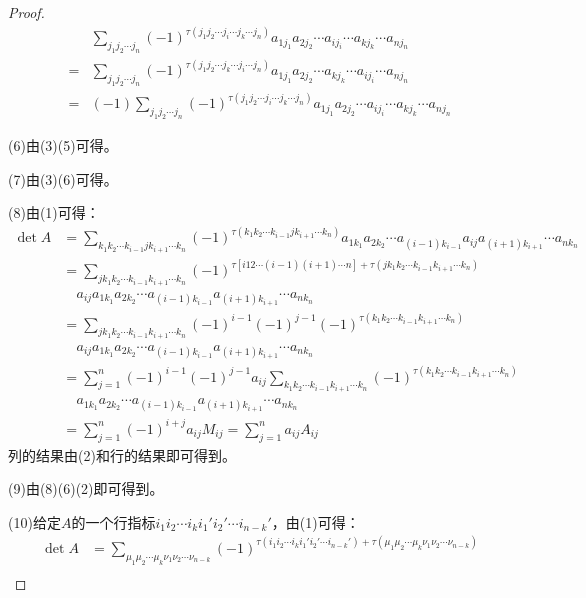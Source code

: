 \begin{proof}
	\begin{align*}
		&\sum_{j_1j_2\cdots j_n}^{}(-1)^{\tau(j_1j_2\cdots j_i\cdots j_k\cdots j_n)}a_{1j_1}a_{2j_2}\cdots a_{ij_i}\cdots a_{kj_k}\cdots a_{nj_n} \\
		=&\sum_{j_1j_2\cdots j_n}^{}(-1)^{\tau(j_1j_2\cdots j_k\cdots j_i\cdots j_n)}a_{1j_1}a_{2j_2}\cdots a_{kj_k}\cdots a_{ij_i}\cdots a_{nj_n} \\
		=&(-1)\sum_{j_1j_2\cdots j_n}^{}(-1)^{\tau(j_1j_2\cdots j_i\cdots j_k\cdots j_n)}a_{1j_1}a_{2j_2}\cdots a_{ij_i}\cdots a_{kj_k}\cdots a_{nj_n}
	\end{align*}\par
	(6)由(3)(5)可得。\par
	(7)由(3)(6)可得。\par
	(8)由(1)可得：
	\begin{align*}
		\det A&=\sum_{k_1k_2\cdots k_{i-1}jk_{i+1}\cdots k_n}^{}(-1)^{\tau(k_1k_2\cdots k_{i-1}jk_{i+1}\cdots k_n)}a_{1k_1}a_{2k_2}\cdots a_{(i-1)k_{i-1}}a_{ij}a_{(i+1)k_{i+1}}\cdots a_{nk_n} \\
		&=\sum_{jk_1k_2\cdots k_{i-1}k_{i+1}\cdots k_n}^{}(-1)^{\tau[i12\cdots(i-1)(i+1)\cdots n]+\tau(jk_1k_2\cdots k_{i-1}k_{i+1}\cdots k_n)} \\
		&\quad a_{ij}a_{1k_1}a_{2k_2}\cdots a_{(i-1)k_{i-1}}a_{(i+1)k_{i+1}}\cdots a_{nk_n} \\
		&=\sum_{jk_1k_2\cdots k_{i-1}k_{i+1}\cdots k_n}^{}(-1)^{i-1}(-1)^{j-1}(-1)^{\tau(k_1k_2\cdots k_{i-1}k_{i+1}\cdots k_n)} \\
		&\quad a_{ij}a_{1k_1}a_{2k_2}\cdots a_{(i-1)k_{i-1}}a_{(i+1)k_{i+1}}\cdots a_{nk_n} \\
		&=\sum_{j=1}^{n}(-1)^{i-1}(-1)^{j-1}a_{ij}\sum_{k_1k_2\cdots k_{i-1}k_{i+1}\cdots k_n}(-1)^{\tau(k_1k_2\cdots k_{i-1}k_{i+1}\cdots k_n)} \\
		&\quad a_{1k_1}a_{2k_2}\cdots a_{(i-1)k_{i-1}}a_{(i+1)k_{i+1}}\cdots a_{nk_n} \\
		&=\sum_{j=1}^{n}(-1)^{i+j}a_{ij}M_{ij}=\sum_{j=1}^{n}a_{ij}A_{ij}
	\end{align*}
	列的结果由(2)和行的结果即可得到。\par
	(9)由(8)(6)(2)即可得到。\par
	(10)给定$A$的一个行指标$i_1i_2\cdots i_ki_1'i_2'\cdots i_{n-k}'$，由(1)可得：
	\begin{align*}
		\det A&=\sum_{\mu_1\mu_2\cdots\mu_k\nu_1\nu_2\cdots\nu_{n-k}}(-1)^{\tau(i_1i_2\cdots i_ki_1'i_2'\cdots i_{n-k}')+\tau(\mu_1\mu_2\cdots\mu_k\nu_1\nu_2\cdots\nu_{n-k})} \\

\end{align*}
\end{proof}
